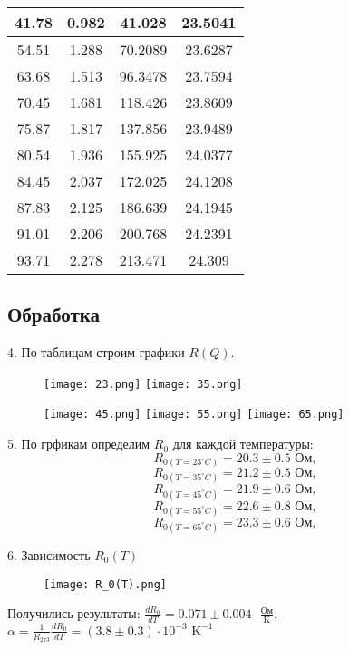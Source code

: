 \begin{table}
\begin{tabular}{|c|c|c|c|}
    \hline
    41.78 & 0.982 & 41.028 & 23.5041 \\
    \hline
    54.51 & 1.288 & 70.2089 & 23.6287 \\
    \hline
    63.68 & 1.513 & 96.3478 & 23.7594 \\
    \hline
    70.45 & 1.681 & 118.426 & 23.8609 \\
    \hline
    75.87 & 1.817 & 137.856 & 23.9489 \\
    \hline
    80.54 & 1.936 & 155.925 & 24.0377 \\
    \hline
    84.45 & 2.037 & 172.025 & 24.1208 \\
    \hline
    87.83 & 2.125 & 186.639 & 24.1945 \\
    \hline
    91.01 & 2.206 & 200.768 & 24.2391 \\
    \hline
    93.71 & 2.278 & 213.471 & 24.309 \\
    \hline
    \end{tabular}
\end{table}
\subsection{Обработка}

4. По таблицам строим графики $R(Q)$.
\begin{figure}[h]
    \texttt{[image: 23.png]}
    \texttt{[image: 35.png]}
\end{figure}
\begin{figure}[h]
    \texttt{[image: 45.png]}
    \texttt{[image: 55.png]}
    \texttt{[image: 65.png]}
\end{figure}

5. По грфикам определим $R_0$ для каждой температуры:
\[R_{0\left(T = 23^\circ C\right)} = 20.3 \pm 0.5 \text{ Ом},\]
\[R_{0\left(T = 35^\circ C\right)} = 21.2 \pm 0.5 \text{ Ом},\]
\[R_{0\left(T = 45^\circ C\right)} = 21.9 \pm 0.6 \text{ Ом},\]
\[R_{0\left(T = 55^\circ C\right)} = 22.6 \pm 0.8 \text{ Ом},\]
\[R_{0\left(T = 65^\circ C\right)} = 23.3 \pm 0.6 \text{ Ом},\]

6. Зависимость $R_0 (T)$
\begin{figure}[h]
    \texttt{[image: R\_0(T).png]}
\end{figure}

Получились результаты: $\frac{dR_0}{dT} = 0.071 \pm 0.004 \text{ }\frac{\text{Ом}}{\text{K}}$, $\alpha = \frac{1}{R_{273}}\frac{dR_0}{dT} = (3.8 \pm 0.3) \cdot 10^{-3} \text{ K}^{-1}$

